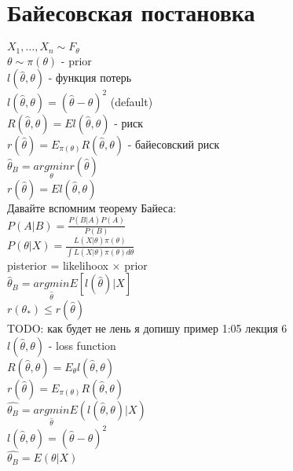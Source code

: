 \documentclass{article}
\newcommand\0{\mathbb{0}}
\newcommand\1{\mathbb{1}}
\begin{document}
\section{Байесовская постановка}
$X_1, \dots, X_n \sim F_\theta$\\
$\theta \sim \pi(\theta)$ - prior\\
$l(\widehat{\theta}, \theta)$ - функция потерь\\
$l(\widehat{\theta}, \theta) = (\widehat{\theta} - \theta)^2$ (default)\\
$R(\widehat{\theta}, \theta) = El(\widehat{\theta}, \theta)$ - риск\\
$r(\widehat{\theta}) = E_{\pi(\theta)}R(\widehat{\theta}, \theta)$ - байесовский риск\\
$\widehat{\theta}_B = \underset{\theta}{argmin}r(\widehat{\theta})$\\
$r(\widehat{\theta}) = El(\widehat{\theta}, \theta)$\\
Давайте вспомним теорему Байеса:\\
$P(A | B) = \frac{P(B | A)P(A)}{P(B)}$\\
$P(\theta | X) = \frac{L(X|\theta)\pi(\theta)}{\displaystyle\int L(X | \theta)\pi(\theta)d\theta}$\\
pisterior = likelihoox $\times$ prior\\
$\widehat{\theta}_B = \underset{\widehat{\theta}}{argmin}E[l(\widehat{\theta}) | X]$\\
$r(\theta_*) \leq r(\widehat{\theta})$\\
TODO: как будет не лень я допишу пример 1:05 лекция 6\\
$l(\widehat{\theta}, \theta)$ - loss function\\
$R(\widehat{\theta}, \theta) = E_\theta l(\widehat{\theta}, \theta)$\\
$r(\widehat{\theta}) = E_{\pi(\theta)}R(\widehat{\theta}, \theta)$\\
$\widehat{\theta_B} = \underset{\widehat{\theta}}{argmin} E(l(\widehat{\theta}, \theta) | X)$\\
$l(\widehat{\theta}, \theta) = (\widehat{\theta} - \theta)^2$\\
$\widehat{\theta_B} = E(\theta | X)$
\end{document}
